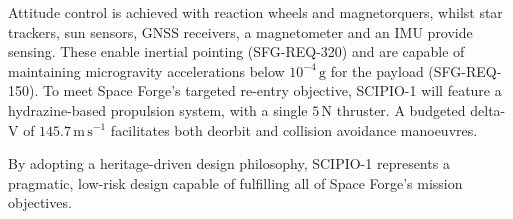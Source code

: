 \documentclass[a4paper, 11pt, conference]{IEEEtran}
\begin{document}
Attitude control is achieved with reaction wheels and magnetorquers, whilst star trackers, sun sensors, GNSS\label{nom:gnss} receivers, a magnetometer and an IMU\label{nom:imu} provide sensing. These enable inertial pointing (SFG-REQ-320) and are capable of maintaining microgravity accelerations below $10^{-4}\,\mathrm{g}$ for the payload (SFG-REQ-150). To meet Space Forge’s targeted re-entry objective, SCIPIO-1 will feature a hydrazine-based propulsion system, with a single $5\,\mathrm{N}$ thruster. A budgeted delta-V of $145.7\,\mathrm{m\,s}^{-1}$ facilitates both deorbit and collision avoidance manoeuvres.

By adopting a heritage-driven design philosophy, SCIPIO-1 represents a pragmatic, low-risk design capable of fulfilling all of Space Forge's mission objectives.

\onecolumn
\clearpage
\end{document}
